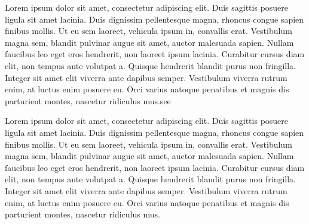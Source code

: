 \documentclass[
  letterpaper,
  toc=chapterentrywithdots,
  listof=totoc,
  11pt,
  headings=small,
  usegeometry]{scrreprt}
\begin{document}
Lorem ipsum dolor sit amet, consectetur adipiscing elit. Duis sagittis
posuere ligula sit amet lacinia. Duis dignissim pellentesque magna,
rhoncus congue sapien finibus mollis. Ut eu sem laoreet, vehicula ipsum
in, convallis erat. Vestibulum magna sem, blandit pulvinar augue sit
amet, auctor malesuada sapien. Nullam faucibus leo eget eros hendrerit,
non laoreet ipsum lacinia. Curabitur cursus diam elit, non tempus ante
volutpat a. Quisque hendrerit blandit purus non fringilla. Integer sit
amet elit viverra ante dapibus semper. Vestibulum viverra rutrum enim,
at luctus enim posuere eu. Orci varius natoque penatibus et magnis dis
parturient montes, nascetur ridiculus mus.see 

    \clearpage
    \areaset[current]{9in}{5.5in}
    \setlength{\oddsidemargin}{0in}
    \setlength{\evensidemargin}{0in}
    \setlength{\topmargin}{-0.5in}
    \setlength{\headheight}{30pt}
    \setlength{\headsep}{25pt}
    \setlength{\footskip}{1in}
    \pagestyle{scrheadings}

\begin{table}[H]

\caption{\label{tbl-summary-2}Descriptive Statistics of Studies
Included}

\centering{



}

\end{table}%

    \clearpage
    \savedportrait
    \pagestyle{scrheadings}

Lorem ipsum dolor sit amet, consectetur adipiscing elit. Duis sagittis
posuere ligula sit amet lacinia. Duis dignissim pellentesque magna,
rhoncus congue sapien finibus mollis. Ut eu sem laoreet, vehicula ipsum
in, convallis erat. Vestibulum magna sem, blandit pulvinar augue sit
amet, auctor malesuada sapien. Nullam faucibus leo eget eros hendrerit,
non laoreet ipsum lacinia. Curabitur cursus diam elit, non tempus ante
volutpat a. Quisque hendrerit blandit purus non fringilla. Integer sit
amet elit viverra ante dapibus semper. Vestibulum viverra rutrum enim,
at luctus enim posuere eu. Orci varius natoque penatibus et magnis dis
parturient montes, nascetur ridiculus mus. 

\begin{table}[H]
\caption{Yet Another Descriptive Statistics}
\label{tab:sumstats}

\end{table}
\end{document}
